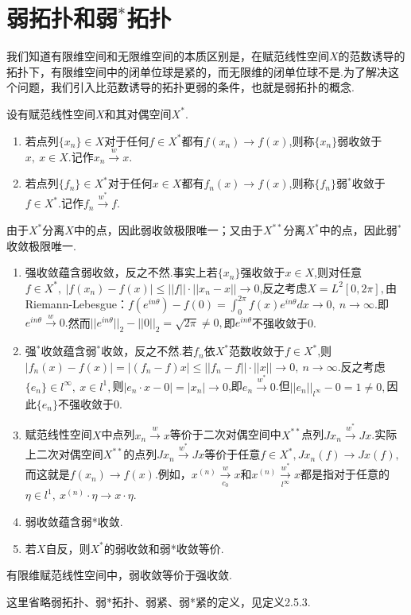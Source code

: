 \documentclass[lang=cn,10pt]{elegantbook}
\begin{document}
	\section{弱拓扑和弱\(^*\)拓扑}
	我们知道有限维空间和无限维空间的本质区别是，在赋范线性空间\(X\)的范数诱导的拓扑下，有限维空间中的闭单位球是紧的，而无限维的闭单位球不是.为了解决这个问题，我们引入比范数诱导的拓扑更弱的条件，也就是弱拓扑的概念.
	\begin{definition}[弱收敛和弱\(^*\)收敛]
		设有赋范线性空间\(X\)和其对偶空间\(X^*\).
		\begin{enumerate}
			\item 若点列\(\{x_n\}\in X\)对于任何\(f\in X^*\)都有\(f(x_n)\to f(x)\),则称\(\{x_n\}\)弱收敛于\(x,\ x\in X.\)记作\(x_n\xrightarrow{w}x.\)
			\item 若点列\(\{f_n\}\in X^*\)对于任何\(x\in X\)都有\(f_n(x)\to f(x)\),则称\(\{f_n\}\)弱\(^*\)收敛于\(f\in X^*\).记作\(f_n\xrightarrow{w^*}f\).
		\end{enumerate}
	\end{definition}
	\begin{note}
		由于\(X^*\)分离\(X\)中的点，因此弱收敛极限唯一；又由于\(X^{**}\)分离\(X^*\)中的点，因此弱\(^*\)收敛极限唯一.
	\end{note}
	\begin{proposition}
		\begin{enumerate}
			\item 强收敛蕴含弱收敛，反之不然.事实上若\(\{x_n\}\)强收敛于\(x\in X\),则对任意\(f\in X^*,\ |f(x_n)-f(x)|\le ||f||\cdot ||x_n-x||\to 0\),反之考虑\(X=L^2[0,2\pi],\)由Riemann-Lebesgue：\(f(e^{in\theta})-f(0)=\int_{0}^{2\pi}f(x)e^{in\theta}dx\to 0,\ n\to \infty.\)即\(e^{in\theta}\xrightarrow{w}0.\)然而\(||e^{in\theta}||_2-||0||_2=\sqrt{2\pi}\ne 0,\)即\(e^{in\theta}\)不强收敛于0.
			\item 强\(^*\)收敛蕴含弱\(^*\)收敛，反之不然.若\(f_n\)依\(X^*\)范数收敛于\(f\in X^*\),则\(|f_n(x)-f(x)|=|(f_n-f)x|\le ||f_n-f||\cdot ||x||\to 0,\ n\to \infty.\)反之考虑\(\{e_n\}\in l^\infty,\ x\in l^1,\)则\(|e_n\cdot x-0|=|x_n|\to 0\),即\(e_n\xrightarrow{w^*}0\).但\(||e_n||_{l^\infty}-0=1\ne 0,\)因此\(\{e_n\}\)不强收敛于0.
			\item 赋范线性空间\(X\)中点列\(x_n\xrightarrow{w}x\)等价于二次对偶空间中\(X^{**}\)点列\(Jx_n\xrightarrow{w^*}Jx\).实际上二次对偶空间\(X^{**}\)的点列\(Jx_n\xrightarrow{w^*}Jx\)等价于任意\(f\in X^*,Jx_n(f)\to Jx(f),\)而这就是\(f(x_n)\to f(x)\).例如，\(x^{(n)}\xrightarrow[c_0]{w}x\)和\(x^{(n)}\xrightarrow[l^\infty]{w^*}x\)都是指对于任意的\(\eta \in l^1,\ x^{(n)}\cdot \eta\to x\cdot \eta\).
			\item 弱收敛蕴含弱*收敛.
			\item 若\(X\)自反，则\(X^*\)的弱收敛和弱*收敛等价.
		\end{enumerate}
	\end{proposition}
	\begin{note}
		有限维赋范线性空间中，弱收敛等价于强收敛.
	\end{note}
	这里省略弱拓扑、弱*拓扑、弱紧、弱*紧的定义，见定义2.5.3.
	
\end{document}
